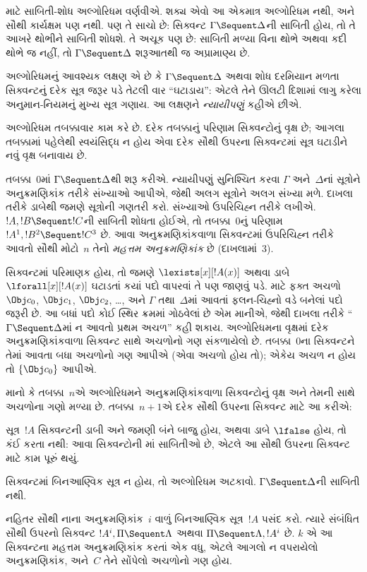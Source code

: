  માટે
સાબિતી-શોધ
અલ્ગોરિધમ વર્ણવીએ.
શક્ય એવો
આ એકમાત્ર
અલ્ગોરિધમ નથી,
અને સૌથી
કાર્યક્ષમ પણ
નથી. પણ તે
સાચો છે:
સિક્વન્ટ
$\Gamma \Sequent \Delta$ની
સાબિતી
હોય, તો
તે આખરે
થોભીને
સાબિતી
શોધશે. તે
અચૂક પણ
છે: સાબિતી
મળ્યા વિના
થોભે અથવા
કદી થોભે
જ નહીં,
તો
$\Gamma
\Sequent \Delta$
શરૂઆતથી જ
અપ્રામાણ્ય
છે.

અલ્ગોરિધમનું
આવશ્યક લક્ષણ
એ છે કે
$\Gamma \Sequent \Delta$
અથવા શોધ
દરમિયાન મળતા
સિક્વન્ટનું
દરેક
સૂત્ર
જરૂર પડે
તેટલી વાર
``ઘટાડાય'':
એટલે તેને
ઊલટી દિશામાં
લાગુ કરેલા
અનુમાન-નિયમનું
મુખ્ય સૂત્ર
ગણાય. આ
લક્ષણને
\emph{ન્યાયીપણું}
કહીએ છીએ.

અલ્ગોરિધમ
તબક્કાવાર
કામ કરે છે.
દરેક તબક્કાનું
પરિણામ
સિક્વન્ટોનું
વૃક્ષ છે;
આગલા તબક્કામાં
પહેલેથી સ્વયંસિદ્ધ
ન હોય એવા
દરેક સૌથી
ઉપરના સિક્વન્ટમાં
સૂત્ર
ઘટાડીને
નવું વૃક્ષ
બનાવાય છે.

તબક્કા~$0$માં
$\Gamma \Sequent \Delta$થી
શરૂ કરીએ.
ન્યાયીપણું
સુનિશ્ચિત કરવા
$\Gamma$
અને~$\Delta$નાં
સૂત્રોને
અનુક્રમણિકાંક
તરીકે સંખ્યાઓ
આપીએ, જેથી
અલગ
સૂત્રોને
અલગ સંખ્યા
મળે. દાખલા
તરીકે ડાબેથી
જમણે
સૂત્રોની
ગણતરી કરો.
સંખ્યાઓ
ઉપરિચિહ્ન
તરીકે
લખીએ.
$!A, !B \Sequent !C$ની
સાબિતી
શોધતા હોઈએ,
તો તબક્કા~$0$નું
પરિણામ
$!A^1, !B^2 \Sequent !C^3$
છે. આવા
અનુક્રમણિકાંકવાળા
સિક્વન્ટમાં
ઉપરિચિહ્ન
તરીકે આવતો
સૌથી મોટો~$n$
તેનો
\emph{મહત્તમ
અનુક્રમણિકાંક}
છે (દાખલામાં~$3$).

સિક્વન્ટમાં
પરિમાણક
હોય, તો જમણે
$\lexists[x][!A(x)]$
અથવા ડાબે
$\lforall[x][!A(x)]$
ઘટાડતાં કયાં
પદો વાપરવાં
તે પણ જાણવું
પડે. માટે
ફક્ત
અચળો
$\Obj c_0$,
$\Obj c_1$,
$\Obj c_2$,
\dots, અને
$\Gamma$
તથા~$\Delta$માં
આવતાં ફલન-ચિહ્નો
વડે બનેલાં
પદો જરૂરી
છે. આ
બધાં પદો
કોઈ સ્થિર
ક્રમમાં ગોઠવેલાં
છે એમ
માનીએ, જેથી
દાખલા તરીકે
``$\Gamma \Sequent \Delta$માં
ન આવતો
પ્રથમ
અચળ''
કહી શકાય.
અલ્ગોરિધમના
વૃક્ષમાં દરેક
અનુક્રમણિકાંકવાળા
સિક્વન્ટ સાથે
અચળોનો
ગણ સંકળાયેલો
છે. તબક્કા~$0$ના
સિક્વન્ટને
તેમાં આવતા
બધા
અચળોનો
ગણ આપીએ
(એવા અચળો
હોય તો);
એકેય અચળ
ન
હોય તો
$\{\Obj c_0\}$
આપીએ.

માનો કે
તબક્કા~$n$એ
અલ્ગોરિધમને
અનુક્રમણિકાંકવાળા
સિક્વન્ટોનું
વૃક્ષ અને
તેમની સાથે
અચળોના
ગણો મળ્યા
છે. તબક્કા~$n+1$એ
દરેક સૌથી
ઉપરના સિક્વન્ટ
માટે આ
કરીએ:

સૂત્ર~$!A$
સિક્વન્ટની
ડાબી અને
જમણી બંને
બાજુ હોય,
અથવા ડાબે
$\lfalse$
હોય, તો
કંઈ કરતા
નથી: આવા
સિક્વન્ટોની
માં
સાબિતીઓ
છે, એટલે
આ સૌથી
ઉપરના સિક્વન્ટ
માટે કામ
પૂરું થયું.

સિક્વન્ટમાં
બિનઆણ્વિક
સૂત્ર
ન હોય,
તો અલ્ગોરિધમ
અટકાવો.
$\Gamma \Sequent \Delta$ની
સાબિતી નથી.

નહિતર સૌથી
નાના
અનુક્રમણિકાંક~$i$
વાળું
બિનઆણ્વિક
સૂત્ર~$!A$
પસંદ કરો.
ત્યારે સંબંધિત
સૌથી ઉપરનો
સિક્વન્ટ
$!A^i, \Pi
\Sequent \Lambda$
અથવા
$\Pi \Sequent \Lambda, !A^i$
છે.
$k$ એ
આ સિક્વન્ટના
મહત્તમ
અનુક્રમણિકાંક
કરતાં એક
વધુ, એટલે
આગલો ન
વપરાયેલો
અનુક્રમણિકાંક,
અને~$C$
તેને સોંપેલો
અચળોનો
ગણ હોય.

